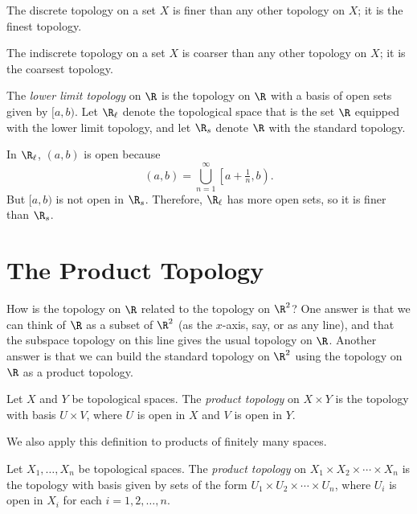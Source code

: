 \documentclass[noname]{notes}
\begin{document}
\begin{example}
	The discrete topology on a set $X$ is finer than any other topology on $X$; it is the finest topology. 
\end{example}

\begin{example}
	The indiscrete topology on a set $X$ is coarser than any other topology on $X$; it is the coarsest topology. 
\end{example}

\begin{example}
	The \emph{lower limit topology} on $\R$ is the topology on $\R$ with a basis of open sets given by $[a,b)$. Let $\R_\ell$ denote the topological space that is the set $\R$ equipped with the lower limit topology, and let $\R_s$ denote $\R$ with the standard topology.  

	In $\R_\ell$, $(a,b)$ is open because 
		\[
			(a,b) = \bigcup_{n=1}^\infty \left[a+\tfrac{1}{n},b\right).
		\]
	But $[a,b)$ is not open in $\R_s$. Therefore, $\R_\ell$ has more open sets, so it is finer than $\R_s$. 
\end{example}

\section{The Product Topology}

How is the topology on $\R$ related to the topology on $\R^2$? One answer is that we can think of $\R$ as a subset of $\R^2$ (as the $x$-axis, say, or as any line), and that the subspace topology on this line gives the usual topology on $\R$. Another answer is that we can build the standard topology on $\R^2$ using the topology on $\R$ as a product topology. 

\begin{definition}
	Let $X$ and $Y$ be topological spaces. The \emph{product topology} on $X \times Y$ is the topology with basis $U \times V$, where $U$ is open in $X$ and $V$ is open in $Y$. 
\end{definition} 

We also apply this definition to products of finitely many spaces. 

\begin{definition}
	Let $X_1, \ldots, X_n$ be topological spaces. The \emph{product topology} on $X_1 \times X_2 \times \cdots \times X_n$ is the topology with basis given by sets of the form $U_1 \times U_2 \times \cdots \times U_n$, where $U_i$ is open in $X_i$ for each $i = 1,2, \ldots, n$. 
\end{definition}
\end{document}
